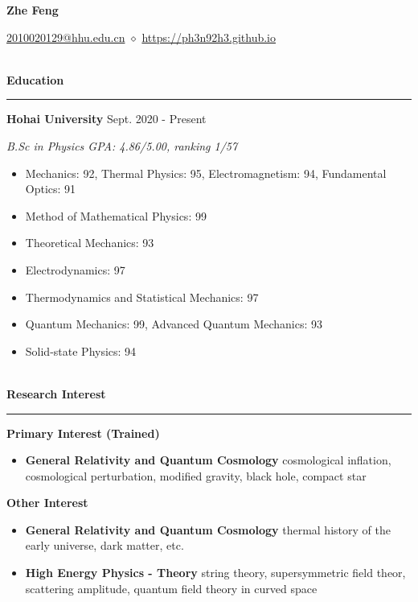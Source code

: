 \documentclass[12pt]{article}
\newcommand{\sect}[1]{
    ~\\ \noindent \textbf{#1} \medskip \hrule \medskip
}
\begin{document}
\pagestyle{empty}


\begin{center}
    \LARGE{\textbf{Zhe Feng}}
\end{center}

\begin{center}
    \href{mailto:2010020129@hhu.edu.cn}{2010020129@hhu.edu.cn} $\diamond$ \href{https://ph3n92h3.github.io}{https://ph3n92h3.github.io}
\end{center}


\sect{Education}

\textbf{Hohai University} \hfill Sept. 2020 - Present

\textit{B.Sc in Physics \hfill GPA: 4.86/5.00, ranking 1/57}

\begin{itemize}[noitemsep,nolistsep]
    \item Mechanics: 92, Thermal Physics: 95, Electromagnetism: 94, Fundamental Optics: 91
    \item Method of Mathematical Physics: 99
    \item Theoretical Mechanics: 93
    \item Electrodynamics: 97
    \item Thermodynamics and Statistical Mechanics: 97
    \item Quantum Mechanics: 99, Advanced Quantum Mechanics: 93
    \item Solid-state Physics: 94
\end{itemize}


\sect{Research Interest}

\textbf{Primary Interest (Trained)}
\begin{itemize}[noitemsep,nolistsep]
    \item \textbf{General Relativity and Quantum Cosmology} cosmological inflation, cosmological perturbation, modified gravity, black hole, compact star
\end{itemize}

\textbf{Other Interest}
\begin{itemize}[noitemsep,nolistsep]
    \item \textbf{General Relativity and Quantum Cosmology} thermal history of the early universe, dark matter, etc.
    \item \textbf{High Energy Physics - Theory} string theory, supersymmetric field theor, scattering amplitude, quantum field theory in curved space
\end{itemize}
\end{document}
